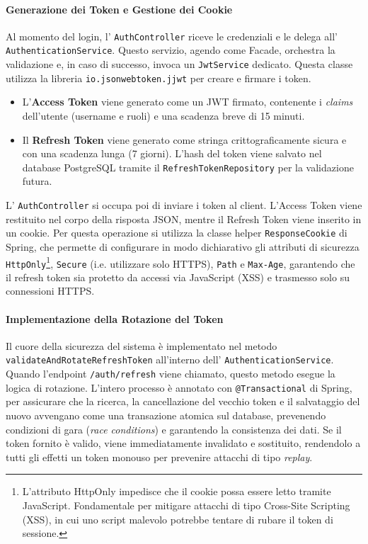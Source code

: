 \documentclass[12pt,a4paper,openright,twoside]{book}
\begin{document}
\paragraph{Generazione dei Token e Gestione dei Cookie}
Al momento del login, l' \texttt{Auth\allowbreak Controller} riceve le credenziali e le delega all' \texttt{Authentication\allowbreak Service}. Questo servizio, agendo come Facade, orchestra la validazione e, in caso di successo, invoca un \texttt{Jwt\allowbreak Service} dedicato. Questa classe utilizza la libreria \texttt{io.\allowbreak jsonwebtoken.\allowbreak jjwt} per creare e firmare i token.
\begin{itemize}
    \item L'\textbf{Access Token} viene generato come un JWT firmato, contenente i \textit{claims} dell'utente (username e ruoli) e una scadenza breve di 15 minuti.
    \item Il \textbf{Refresh Token} viene generato come stringa crittograficamente sicura e con una scadenza lunga (7 giorni). L'hash del token viene salvato nel database PostgreSQL tramite il \texttt{RefreshTokenRepository} per la validazione futura.
\end{itemize}
L' \texttt{AuthController} si occupa poi di inviare i token al client. L'Access Token viene restituito nel corpo della risposta JSON, mentre il Refresh Token viene inserito in un cookie. Per questa operazione si utilizza la classe helper \texttt{ResponseCookie} di Spring, che permette di configurare in modo dichiarativo gli attributi di sicurezza \texttt{HttpOnly}\footnote{L'attributo HttpOnly impedisce che il cookie possa essere letto tramite JavaScript. Fondamentale per mitigare attacchi di tipo Cross-Site Scripting (XSS), in cui uno script malevolo potrebbe tentare di rubare il token di sessione.}, \texttt{Secure} (i.e. utilizzare solo HTTPS), \texttt{Path} e \texttt{Max-Age}, garantendo che il refresh token sia protetto da accessi via JavaScript (XSS) e trasmesso solo su connessioni HTTPS.

\paragraph{Implementazione della Rotazione del Token}
Il cuore della sicurezza del sistema è implementato nel metodo \texttt{validateAndRotateRefreshToken} all'interno dell' \texttt{AuthenticationService}. Quando l'endpoint \texttt{/auth/refresh} viene chiamato, questo metodo esegue la logica di rotazione. L'intero processo è annotato con \texttt{@Transactional} di Spring, per assicurare che la ricerca, la cancellazione del vecchio token e il salvataggio del nuovo avvengano come una transazione atomica sul database, prevenendo condizioni di gara (\textit{race conditions}) e garantendo la consistenza dei dati. Se il token fornito è valido, viene immediatamente invalidato e sostituito, rendendolo a tutti gli effetti un token monouso per prevenire attacchi di tipo \textit{replay}.
\end{document}
